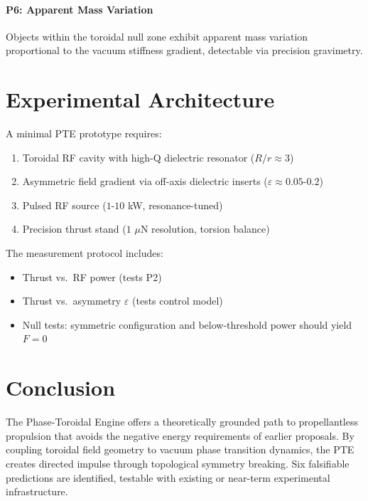 \documentclass[12pt,a4paper]{article}
\begin{document}
\paragraph{P6: Apparent Mass Variation} Objects within the toroidal null zone exhibit apparent mass variation proportional to the vacuum stiffness gradient, detectable via precision gravimetry.

\section{Experimental Architecture}

A minimal PTE prototype requires:
\begin{enumerate}
    \item Toroidal RF cavity with high-Q dielectric resonator ($R/r \approx 3$)
    \item Asymmetric field gradient via off-axis dielectric inserts ($\varepsilon \approx 0.05$-$0.2$)
    \item Pulsed RF source ($1$-$10$ kW, resonance-tuned)
    \item Precision thrust stand ($1$ $\mu$N resolution, torsion balance)
\end{enumerate}

The measurement protocol includes:
\begin{itemize}
    \item Thrust vs.\ RF power (tests P2)
    \item Thrust vs.\ asymmetry $\varepsilon$ (tests control model)
    \item Null tests: symmetric configuration and below-threshold power should yield $F = 0$
\end{itemize}

\section{Conclusion}

The Phase-Toroidal Engine offers a theoretically grounded path to propellantless propulsion that avoids the negative energy requirements of earlier proposals. By coupling toroidal field geometry to vacuum phase transition dynamics, the PTE creates directed impulse through topological symmetry breaking. Six falsifiable predictions are identified, testable with existing or near-term experimental infrastructure.
\end{document}
